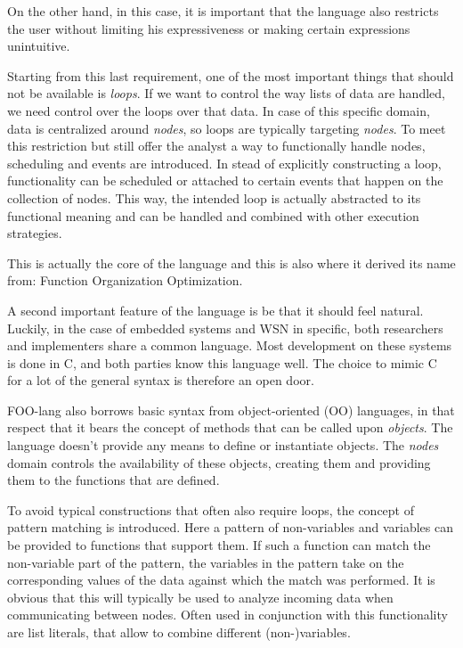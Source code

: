 \documentclass[conference]{IEEEtran}
\begin{document}
On the other hand, in this case, it is important that the language also
restricts the user without limiting his expressiveness or making certain
expressions unintuitive.

Starting from this last requirement, one of the most important things that
should not be available is \emph{loops}. If we want to control the way lists of
data are handled, we need control over the loops over that data. In case of
this specific domain, data is centralized around \emph{nodes}, so loops are
typically targeting \emph{nodes}. To meet this restriction but still offer the
analyst a way to functionally handle nodes, scheduling and events are
introduced. In stead of explicitly constructing a loop, functionality can be
scheduled or attached to certain events that happen on the collection of nodes.
This way, the intended loop is actually abstracted to its functional meaning
and can be handled and combined with other execution strategies.

This is actually the core of the language and this is also where it derived its
name from: Function Organization Optimization.

A second important feature of the language is be that it should feel natural.
Luckily, in the case of embedded systems and WSN in specific, both researchers
and implementers share a common language. Most development on these systems is
done in C, and both parties know this language well. The choice to mimic C for
a lot of the general syntax is therefore an open door.

FOO-lang also borrows basic syntax from object-oriented (OO) languages, in that
respect that it bears the concept of methods that can be called upon
\emph{objects}. The language doesn't provide any means to define or instantiate
objects. The \emph{nodes} domain controls the availability of these objects,
creating them and providing them to the functions that are defined.

To avoid typical constructions that often also require loops, the concept of
pattern matching is introduced. Here a pattern of non-variables and variables
can be provided to functions that support them. If such a function can match
the non-variable part of the pattern, the variables in the pattern take on the
corresponding values of the data against which the match was performed. It is
obvious that this will typically be used to analyze incoming data when
communicating between nodes. Often used in conjunction with this functionality
are list literals, that allow to combine different (non-)variables.
\end{document}
